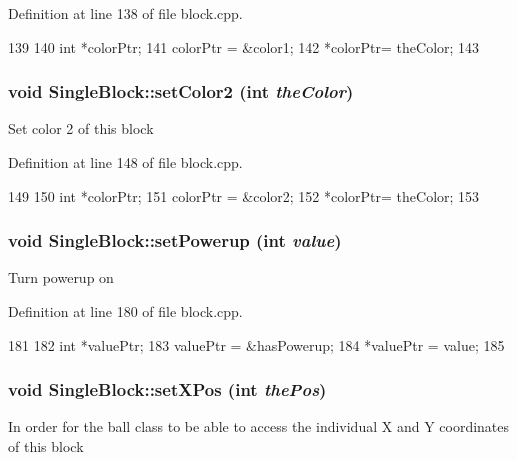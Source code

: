 Definition at line 138 of file block.cpp.


\begin{DoxyCode}
139 {
140     int *colorPtr;
141     colorPtr = &color1;
142     *colorPtr= theColor;
143 }
\end{DoxyCode}
\hypertarget{class_single_block_ad59aa2654804afcc4035695765399fc1}{
\subsubsection[{setColor2}]{\setlength{\rightskip}{0pt plus 5cm}void SingleBlock::setColor2 (int {\em theColor})}}
\label{class_single_block_ad59aa2654804afcc4035695765399fc1}
Set color 2 of this block 

Definition at line 148 of file block.cpp.


\begin{DoxyCode}
149 {
150     int *colorPtr;
151     colorPtr = &color2;
152     *colorPtr= theColor;
153 }
\end{DoxyCode}
\hypertarget{class_single_block_a6d5eeb09997cf10a0518f8c8fdb1cd7c}{
\subsubsection[{setPowerup}]{\setlength{\rightskip}{0pt plus 5cm}void SingleBlock::setPowerup (int {\em value})}}
\label{class_single_block_a6d5eeb09997cf10a0518f8c8fdb1cd7c}
Turn powerup on 

Definition at line 180 of file block.cpp.


\begin{DoxyCode}
181 {
182     int *valuePtr;
183     valuePtr = &hasPowerup;
184     *valuePtr = value;
185 }
\end{DoxyCode}
\hypertarget{class_single_block_af53a21a1faae0876aa63c907ab6ddc23}{
\subsubsection[{setXPos}]{\setlength{\rightskip}{0pt plus 5cm}void SingleBlock::setXPos (int {\em thePos})}}
\label{class_single_block_af53a21a1faae0876aa63c907ab6ddc23}
In order for the ball class to be able to access the individual X and Y coordinates of this block 

